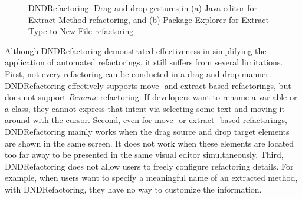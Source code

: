 \begin{figure}
\centering
{}
\caption{DNDRefactoring: Drag-and-drop gestures in (a) Java editor for Extract Method refactoring, and (b) Package Explorer for Extract Type to New File refactoring~\cite{Lee:2013}.}
\label{fig:dnd}
\end{figure}

Although DNDRefactoring demonstrated effectiveness in simplifying the application of automated refactorings, it still suffers from several limitations. First, not every refactoring can be conducted in a drag-and-drop manner. DNDRefactoring effectively supports move- and extract-based refactorings, but does not support \emph{Rename} refactoring. If developers want to rename a variable or a class, they cannot express that intent via selecting some text and moving it around with the cursor. Second, even for move- or extract- based refactorings, DNDRefactoring mainly works when the drag source and drop target elements are shown in the same screen. It does not work when these elements are located too far away to be presented in the same visual editor simultaneously. Third, DNDRefactoring does not allow users to freely configure refactoring details. For example, when users want to specify a meaningful name of an extracted method, with DNDRefactoring, they have no way to customize the information.

